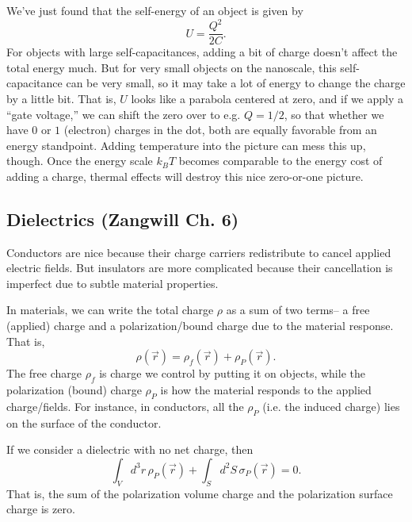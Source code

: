 \begin{exm}
    We've just found that the self-energy of an object is given by
    \begin{equation}
        U= \frac{Q^2}{2C}.
    \end{equation}
    For objects with large self-capacitances, adding a bit of charge doesn't affect the total energy much. But for very small objects on the nanoscale, this self-capacitance can be very small, so it may take a lot of energy to change the charge by a little bit. That is, $U$ looks like a parabola centered at zero, and if we apply a ``gate voltage,'' we can shift the zero over to e.g. $Q=1/2$, so that whether we have $0$ or $1$ (electron) charges in the dot, both are equally favorable from an energy standpoint. Adding temperature into the picture can mess this up, though. Once the energy scale $k_BT$ becomes comparable to the energy cost of adding a charge, thermal effects will destroy this nice zero-or-one picture.
\end{exm}

\subsection*{Dielectrics (Zangwill Ch. 6)}
Conductors are nice because their charge carriers redistribute to cancel applied electric fields. But insulators are more complicated because their cancellation is imperfect due to subtle material properties.

In materials, we can write the total charge $\rho$ as a sum of two terms-- a free (applied) charge and a polarization/bound charge due to the material response. That is,
\begin{equation}
    \rho(\vec r) = \rho_f(\vec r) + \rho_P(\vec r).
\end{equation}
The free charge $\rho_f$ is charge we control by putting it on objects, while the polarization (bound) charge $\rho_P$ is how the material responds to the applied charge/fields. For instance, in conductors, all the $\rho_P$ (i.e. the induced charge) lies on the surface of the conductor.

If we consider a dielectric with no net charge, then
\begin{equation}\label{eqn:unchargeddielectric}
    \int_V d^3 r\, \rho_P(\vec r) + \int_S d^2S \, \sigma_P(\vec r) =0.
\end{equation}
That is, the sum of the polarization volume charge and the polarization surface charge is zero.

